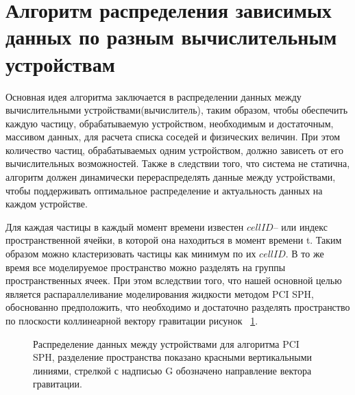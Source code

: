 \section{Алгоритм распределения зависимых данных по разным вычислительным устройствам}\label{sec:ch2/sec3}
Основная идея алгоритма заключается в распределении данных между вычислительными устройствами(вычислитель), таким образом, чтобы обеспечить каждую частицу, обрабатываемую устройством, необходимым и достаточным, массивом данных, для расчета списка соседей и физических величин. При этом количество частиц, обрабатываемых одним устройством, должно зависеть от его вычислительных возможностей. Также в следствии того, что система не статична, алгоритм должен динамически перераспределять данные между устройствами, чтобы поддерживать оптимальное распределение и актуальность данных на каждом устройстве.

Для каждая частицы в каждый момент времени известен \(cellID\)– или индекс пространственной ячейки, в которой она находиться  в момент времени t. Таким образом можно кластеризовать частицы как минимум по их \(cellID\). В то же время все моделируемое пространство можно разделять на группы пространственных ячеек. При этом вследствии  того, что нашей основной целью является распараллеливание моделирования жидкости методом PCI SPH, обоснованно предположить, что необходимо и достаточно разделять пространство по плоскости коллинеарной вектору гравитации рисунок ~\ref{fig:dstr_1}.
\begin{figure}[ht]
  \caption{Распределение данных между устройствами для алгоритма PCI SPH, разделение пространства показано красными вертикальными линиями, стрелкой с надписью G обозначено направление вектора гравитации.}
  \label{fig:dstr_1}
\end{figure}


